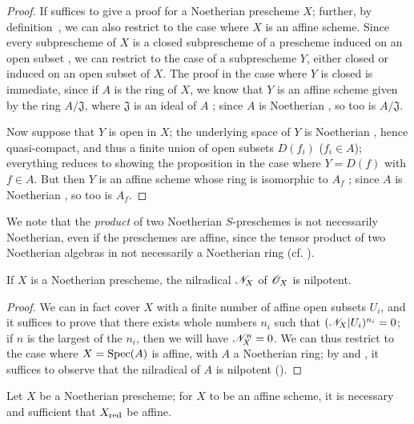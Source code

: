 \begin{proof}
\label{proof-I.6.1.4}
If suffices to give a proof for a Noetherian prescheme $X$;
further, by definition~, we can also restrict to the case where $X$ is an affine scheme.
Since every subprescheme of $X$ is a closed subprescheme of a prescheme induced on an open subset , we can restrict to the case of a subprescheme $Y$, either closed or induced on an open subset of $X$.
The proof in the case where $Y$ is closed is immediate, since if $A$ is the ring of $X$, we know that $Y$ is an affine scheme given by the ring $A/\mathfrak{J}$, where $\mathfrak{J}$ is an ideal of $A$ ;
since $A$ is Noetherian , so too is $A/\mathfrak{J}$.

Now suppose that $Y$ is open in $X$;
the underlying space of $Y$ is Noetherian , hence quasi-compact, and thus a finite union of open subsets $D(f_i)$ ($f_i\in A$);
everything reduces to showing the proposition in the case where $Y=D(f)$ with $f\in A$.
But then $Y$ is an affine scheme whose ring is isomorphic to $A_f$ ;
since $A$ is Noetherian , so too is $A_f$.
\end{proof}

\begin{env}[6.1.5]
\label{I.6.1.5}
We note that the \emph{product} of two Noetherian $S$-preschemes is not necessarily Noetherian, even if the preschemes are affine, since the tensor product of two Noetherian algebras in not necessarily a Noetherian ring (cf. ).
\end{env}

\begin{proposition}[6.1.6]
\label{I.6.1.6}
If $X$ is a Noetherian prescheme, the nilradical $\mathscr{N}_X$ of $\mathscr{O}_X$ is nilpotent.
\end{proposition}

\begin{proof}
\label{proof-I.6.1.6}
We can in fact cover $X$ with a finite number of affine open subsets $U_i$, and it suffices to prove that there exists whole numbers $n_i$ such that $(\mathscr{N}_X|U_i)^{n_i}=0$;
if $n$ is the largest of the $n_i$, then we will have $\mathscr{N}_X^n=0$.
We can thus restrict to the case where $X=\operatorname{Spec}(A)$ is affine, with $A$ a Noetherian ring;
by  and , it suffices to observe that the nilradical of $A$ is nilpotent (\cite[p.~127, cor.~4]{I-11}).
\end{proof}

\begin{corollary}[6.1.7]
\label{I.6.1.7}
Let $X$ be a Noetherian prescheme;
for $X$ to be an affine scheme, it is necessary and sufficient that $X_{\mathrm{red}}$ be affine.
\end{corollary}

